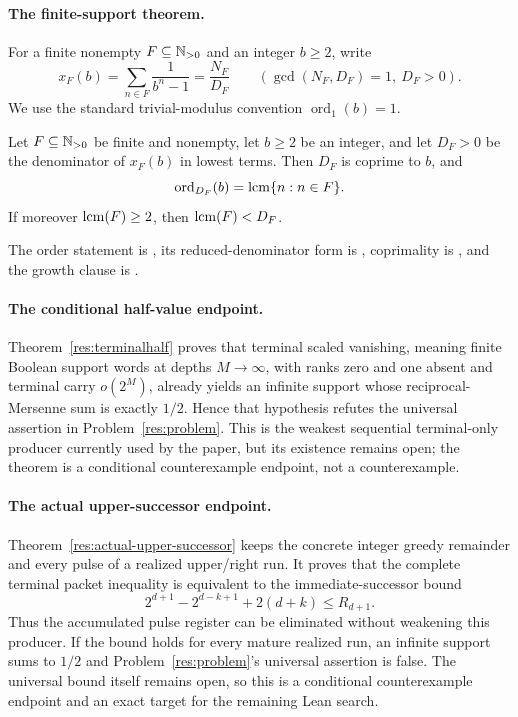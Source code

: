 \documentclass[11pt]{article}
\begin{document}
\paragraph{The finite-support theorem.}
For a finite nonempty $F\subseteq\mathbb{N}_{>0}$ and an integer $b\ge2$, write
\[
  x_F(b)=\sum_{n\in F}\frac1{b^n-1}=\frac{N_F}{D_F}
  \qquad (\gcd(N_F,D_F)=1,\ D_F>0).
\]
We use the standard trivial-modulus convention
$\operatorname{ord}_1(b)=1$.

\begin{theorem}\label{res:period}
Let $F\subseteq\mathbb{N}_{>0}$ be finite and nonempty, let $b\ge2$ be an integer, and
let $D_F>0$ be the denominator of $x_F(b)$ in lowest terms.  Then $D_F$ is
coprime to $b$, and
\[
  \operatorname{ord}_{D_F}(b)=\operatorname{lcm}\{n:n\in F\}.
\]
If moreover $\operatorname{lcm}(F)\ge2$, then $\operatorname{lcm}(F)<D_F$.
\end{theorem}

\noindent The order statement is
,
its reduced-denominator form is
,
coprimality is
,
and the growth clause is
.

\paragraph{The conditional half-value endpoint.}
Theorem~\ref{res:terminalhalf} proves that terminal scaled vanishing, meaning finite
Boolean support words at depths \(M\to\infty\), with ranks zero and one
absent and terminal carry \(o(2^M)\), already yields an infinite support
whose reciprocal-Mersenne sum is exactly \(1/2\).  Hence that hypothesis
refutes the universal assertion in Problem~\ref{res:problem}.  This is the
weakest sequential terminal-only producer currently used by the paper, but
its existence remains open; the theorem is a conditional counterexample
endpoint, not a counterexample.

\paragraph{The actual upper-successor endpoint.}
Theorem~\ref{res:actual-upper-successor} keeps the concrete integer greedy
remainder and every pulse of a realized upper/right run.  It proves that the
complete terminal packet inequality is equivalent to the immediate-successor
bound
\[
  2^{d+1}-2^{d-k+1}+2(d+k)\le R_{d+1}.
\]
Thus the accumulated pulse register can be eliminated without weakening this
producer.  If the bound holds for every mature realized run, an infinite
support sums to \(1/2\) and Problem~\ref{res:problem}'s universal assertion is
false.  The universal bound itself remains open, so this is a conditional
counterexample endpoint and an exact target for the remaining Lean search.
\end{document}
